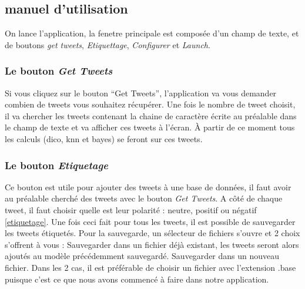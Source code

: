 \documentclass[a4paper,10pt]{report}
\begin{document}
    
    \subsection{manuel d'utilisation}
      On lance l'application, la fenetre principale est composée d'un champ de texte, et de boutons \textit{get tweets}, \textit{Etiquettage}, \textit{Configurer} et 
      \textit{Launch}.
      \subsubsection{Le bouton \textit{Get Tweets}}
	Si vous cliquez sur le bouton ``Get Tweets'', l'application va vous demander combien de tweets vous souhaitez récupérer. Une fois le nombre de tweet choisit,
	il va chercher les tweets contenant la chaine de caractère écrite au préalable dans le champ de texte et va afficher ces tweets à l'écran.
	À partir de ce moment tous les calculs (dico, knn et bayes) se feront sur ces tweets.
      \subsubsection{Le bouton \textit{Etiquetage}}
	Ce bouton est utile pour ajouter des tweets à une base de données, il faut avoir au préalable cherché des tweets avec le bouton \textit{Get Tweets}.
	A côté de chaque tweet, il faut choisir quelle est leur polarité : neutre, positif ou négatif \ref{etiquetage}. Une fois ceci fait pour tous les tweets,
	il est possible de sauvegarder les tweets étiquetés. Pour la sauvegarde, un sélecteur de fichiers s'ouvre et 2 choix s'offrent à vous :
	Sauvegarder dans un fichier déjà existant, les tweets seront alors ajoutés au modèle précédemment sauvegardé.
	Sauvegarder dans un nouveau fichier.  
	Dans les 2 cas, il est préférable de choisir un fichier avec l'extension .base puisque c'est ce que nous avons commencé à faire dans notre application.
\end{document}
